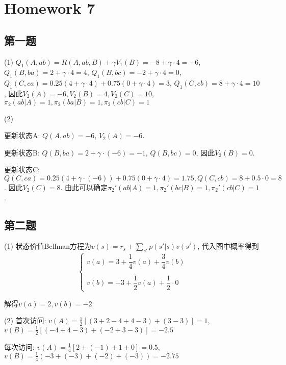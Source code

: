 \section{Homework 7}

\subsection{第一题}

(1) $Q_1(A, ab)=R(A, ab, B)+\gamma V_1(B)=-8 + \gamma \cdot 4=-6$, $Q_1(B, ba)=2 +\gamma \cdot 4=4$, $Q_1(B, bc)=-2+\gamma \cdot 4=0$, $Q_1(C, ca) = 0.25(4 + \gamma \cdot 4) + 0.75(0 + \gamma \cdot 4) = 3$, $Q_1(C, cb) = 8 + \gamma \cdot 4 = 10$, 因此$V_2(A) = -6, V_2(B) = 4, V_2(C) = 10$, $\pi_2(ab|A) = 1, \pi_2(ba|B) = 1, \pi_2(cb|C) = 1$

(2)

更新状态A: $Q(A,ab)=-6$, $V_2(A)=-6$.

更新状态B: $Q(B,ba)=2 + \gamma \cdot (-6) = -1$, $Q(B,bc) = 0$, 因此$V_2(B) = 0$.

更新状态C: $Q(C, ca)=0.25(4 + \gamma \cdot (-6)) + 0.75(0 + \gamma \cdot 4)=1.75, Q(C,cb) = 8 + 0.5 \cdot 0 = 8$. 因此$V_2(C) = 8$. 由此可以确定$\pi_2'(ab|A)=1,\pi_2'(bc|B)=1,\pi_2'(cb|C)=1$.

\subsection{第二题}

(1) 状态价值Bellman方程为$v(s)=r_s+\displaystyle\sum_{s'}^{}p(s'|s)v(s')$, 代入图中概率得到\begin{equation*}
    \left\{
        \begin{array}{ll}
            v(a) = 3 + \dfrac{1}{4}v(a) + \dfrac{3}{4}v(b) \\\\
            v(b) = -3 + \dfrac{1}{2}v(a) + \dfrac{1}{2}\cdot0
        \end{array}
    \right.
\end{equation*}

解得$v(a)=2, v(b)=-2$.

(2) 首次访问: $v(A)=\frac{1}{2}[(3+2-4+4-3)+(3-3)]=1$, $v(B)=\frac{1}{2}[(-4 + 4 - 3) + (-2 + 3 - 3)] = -2.5$

每次访问: $v(A)=\frac{1}{4}[2 + (-1) + 1 + 0] = 0.5$, $v(B)=\frac{1}{4}(-3 + (-3) + (-2) + (-3)) = -2.75$
